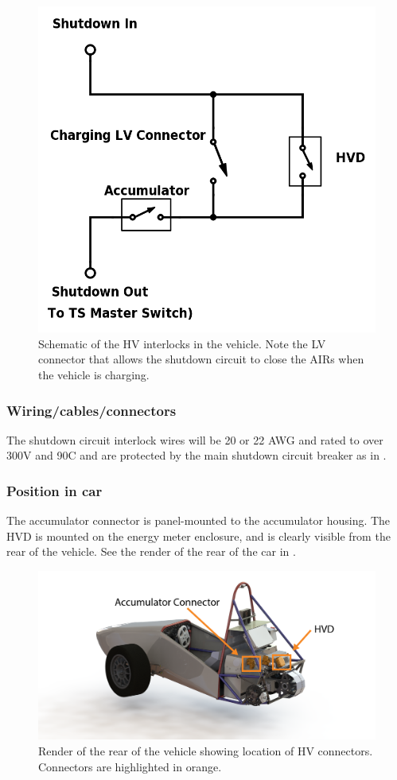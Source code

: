 \documentclass{article}
\begin{document}
\begin{figure}[H]
\centering
\includegraphics[width = .75\textwidth]{HV-connector-schematic.png}
\caption{Schematic of the HV interlocks in the vehicle. Note the LV connector that allows the shutdown circuit to close the AIRs when the vehicle is charging.}
\label{fig:HV_connector_schematic}
\end{figure}

\subsubsection{Wiring/cables/connectors}
The shutdown circuit interlock wires will be 20 or 22 AWG and rated to over 300V and 90\textdegree C and are protected by the main shutdown circuit breaker as in . 

\subsubsection{Position in car}
The accumulator connector is panel-mounted to the accumulator housing. The HVD is mounted on the energy meter enclosure, and is clearly visible from the rear of the vehicle. See the render of the rear of the car in .

\begin{figure}[H]
\centering
\includegraphics[width = .75\textwidth]{TS_interlock_location}
\caption{Render of the rear of the vehicle showing location of HV connectors. Connectors are highlighted in orange. }
\label{fig:rear_of_car}
\end{figure}
\end{document}
